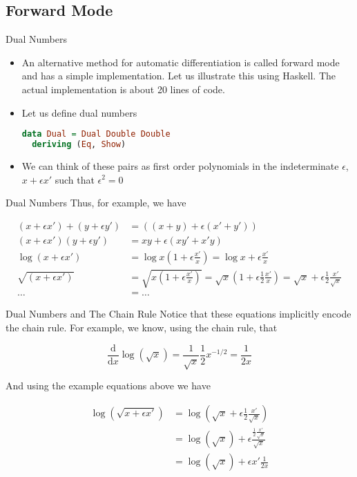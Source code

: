\documentclass{beamer}
\begin{document}
\subsection{Forward Mode}

\begin{frame}[fragile]{Dual Numbers}
\begin{itemize}
\item
An alternative method for automatic differentiation is called forward
mode and has a simple implementation. Let us illustrate this using
Haskell. The actual implementation is about 20 lines of code.
\item
Let us define dual numbers

\begin{lstlisting}[language=Haskell]
data Dual = Dual Double Double
  deriving (Eq, Show)
\end{lstlisting}
\item
We can think of these pairs as first order polynomials in the
indeterminate $\epsilon$, $x + \epsilon x'$ such that $\epsilon^2 = 0$
\end{itemize}
\end{frame}

\begin{frame}[fragile]{Dual Numbers}
Thus, for example, we have

$$
\begin{aligned}
(x + \epsilon x') + (y + \epsilon y') &= ((x + y) + \epsilon (x' + y')) \\
(x + \epsilon x')(y + \epsilon y') &= xy + \epsilon (xy' + x'y) \\
\log (x + \epsilon x') &=
\log x (1 + \epsilon \frac {x'}{x}) =
\log x + \epsilon\frac{x'}{x} \\
\sqrt{(x + \epsilon x')} &=
\sqrt{x(1 + \epsilon\frac{x'}{x})} =
\sqrt{x}(1 + \epsilon\frac{1}{2}\frac{x'}{x}) =
\sqrt{x} + \epsilon\frac{1}{2}\frac{x'}{\sqrt{x}} \\
\ldots &= \ldots
\end{aligned}
$$
\end{frame}

\begin{frame}[fragile]{Dual Numbers and The Chain Rule}
Notice that these equations implicitly encode the chain rule. For
example, we know, using the chain rule, that

$$
\frac{\mathrm{d}}{\mathrm{d} x}\log(\sqrt x) =
\frac{1}{\sqrt x}\frac{1}{2}x^{-1/2} =
\frac{1}{2x}
$$

And using the example equations above we have

$$
\begin{aligned}
\log(\sqrt {x + \epsilon x'}) &= \log (\sqrt{x} + \epsilon\frac{1}{2}\frac{x'}{\sqrt{x}}) \\
                              &= \log (\sqrt{x}) + \epsilon\frac{\frac{1}{2}\frac{x'}{\sqrt{x}}}{\sqrt{x}} \\
                              &= \log (\sqrt{x}) + \epsilon x'\frac{1}{2x}
\end{aligned}
$$
\end{frame}
\end{document}
